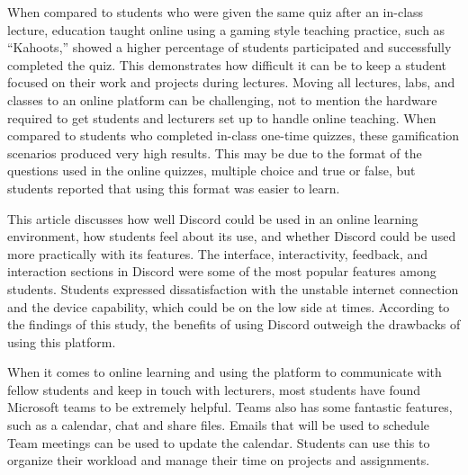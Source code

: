 When compared to students who were given the same quiz after an in-class lecture, education taught online using a gaming style teaching practice, such as “Kahoots,”\cite{ref13} showed a higher percentage of students participated and successfully completed the quiz. This demonstrates how difficult it can be to keep a student focused on their work and projects during lectures. Moving all lectures, labs, and classes to an online platform can be challenging, not to mention the hardware required to get students and lecturers set up to handle online teaching. When compared to students who completed in-class one-time quizzes, these gamification scenarios produced very high results. This may be due to the format of the questions used in the online quizzes, multiple choice and true or false, but students reported that using this format was easier to learn. \cite{ref2} \hfill \break



This article discusses how well Discord could be used in an online learning environment, how students feel about its use, and whether Discord could be used more practically with its features.
The interface, interactivity, feedback, and interaction sections in Discord were some of the most popular features among students. Students expressed dissatisfaction with the unstable internet connection and the device capability, which could be on the low side at times. According to the findings of this study, the benefits of using Discord outweigh the drawbacks of using this platform. \cite{ref3} \hfill \break



When it comes to online learning and using the platform to communicate with fellow students and keep in touch with lecturers, most students have found Microsoft teams to be extremely helpful. Teams also has some fantastic features, such as a calendar, chat and share files. Emails that will be used to schedule Team meetings can be used to update the calendar. Students can use this to organize their workload and manage their time on projects and assignments. \cite{ref4} \hfill \break



